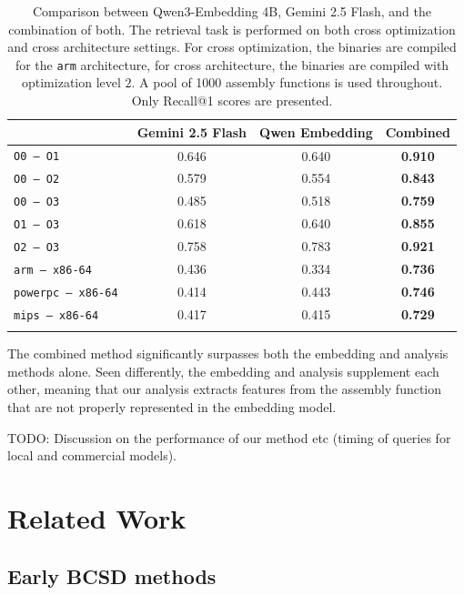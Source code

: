 {
\renewcommand{\arraystretch}{1.1}
\begin{table}[tb]
\centering
\begin{tabular}{l|c|c|c}
\Xhline{2\arrayrulewidth}
                       & Gemini 2.5 Flash & Qwen Embedding & Combined  \\ \hline
\tt O0 -- O1           & 0.646            & 0.640          & \bf 0.910 \\
\tt O0 -- O2           & 0.579            & 0.554          & \bf 0.843 \\
\tt O0 -- O3           & 0.485            & 0.518          & \bf 0.759 \\
\tt O1 -- O3           & 0.618            & 0.640          & \bf 0.855 \\
\tt O2 -- O3           & 0.758            & 0.783          & \bf 0.921 \\
\tt arm -- x86-64      & 0.436            & 0.334          & \bf 0.736 \\
\tt powerpc -- x86-64  & 0.414            & 0.443          & \bf 0.746 \\
\tt mips -- x86-64     & 0.417            & 0.415          & \bf 0.729 \\ \Xhline{2\arrayrulewidth}
\end{tabular}
\caption{Comparison between Qwen3-Embedding 4B, Gemini 2.5 Flash, and the combination of both. The retrieval task is performed on both cross
optimization and cross architecture settings. For cross optimization, the binaries are compiled for the \texttt{arm} architecture, for cross architecture,
the binaries are compiled with optimization level \(2\). A pool of 1000 assembly functions is used throughout. Only Recall@1 scores are presented.}
\label{composite}
\end{table}
}

The combined method significantly surpasses both the embedding and analysis methods alone. Seen differently, the embedding and analysis supplement
each other, meaning that our analysis extracts features from the assembly function that are not properly represented in the embedding model.

TODO: Discussion on the performance of our method etc (timing of queries for local and commercial models).

\section{Related Work}

\subsection{Early BCSD methods}

